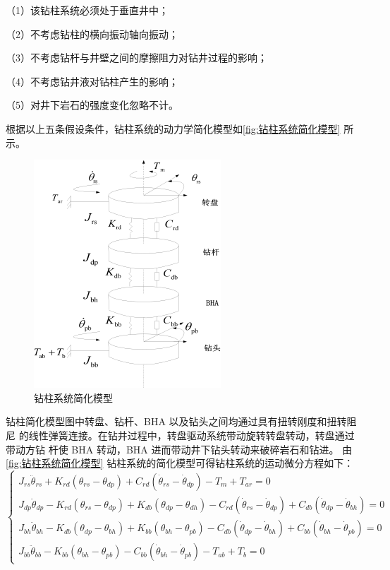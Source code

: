 \documentclass[12pt,hyperref,a4paper,UTF8]{ctexart}
\begin{document}
	（1）该钻柱系统必须处于垂直井中；
	
	（2）不考虑钻柱的横向振动轴向振动；
	
	（3）不考虑钻杆与井壁之间的摩擦阻力对钻井过程的影响；
	
	（4）不考虑钻井液对钻柱产生的影响；
	
	（5）对井下岩石的强度变化忽略不计。
	
	根据以上五条假设条件，钻柱系统的动力学简化模型如\autoref{fig:钻柱系统简化模型} 所示。
	
	
	\begin{figure}[!htbp]
		\centering
		\includegraphics[width=0.5\linewidth]{figures/钻柱系统简化模型}
		\caption{钻柱系统简化模型}
		\label{fig:钻柱系统简化模型}
	\end{figure}
	
	
	钻柱简化模型图中转盘、钻杆、BHA 以及钻头之间均通过具有扭转刚度和扭转阻尼 的线性弹簧连接。在钻井过程中，转盘驱动系统带动旋转转盘转动，转盘通过带动方钻 杆使 BHA 转动，BHA 进而带动井下钻头转动来破碎岩石和钻进。
	由\autoref{fig:钻柱系统简化模型} 钻柱系统的简化模型可得钻柱系统的运动微分方程如下：
	\begin{equation}
		\left\{ \begin{array}{l}
			{J_{rs}}{{\ddot \theta }_{rs}} + {K_{rd}}({\theta _{rs}} - {\theta _{dp}}) + {C_{rd}}({{\dot \theta }_{rs}} - {{\dot \theta }_{dp}}) - {T_m} + {T_{ar}} = 0\\
			{J_{dp}}{{\ddot \theta }_{dp}} - {K_{rd}}({\theta _{rs}} - {\theta _{dp}}) + {K_{db}}({\theta _{dp}} - {\theta _{dh}}) - {C_{rd}}({{\dot \theta }_{rs}} - {{\dot \theta }_{dp}}) + {C_{db}}({{\dot \theta }_{dp}} - {{\dot \theta }_{bh}}) = 0\\
			{J_{bh}}{{\ddot \theta }_{bh}} - {K_{db}}({\theta _{dp}} - {\theta _{bh}}) + {K_{bb}}({\theta _{bh}} - {\theta _{pb}}) - {C_{db}}({{\dot \theta }_{dp}} - {{\dot \theta }_{bh}}) + {C_{bb}}({{\dot \theta }_{bh}} - {{\dot \theta }_{pb}}) = 0\\
			{J_{bb}}{{\ddot \theta }_{bb}} - {K_{bb}}({\theta _{bh}} - {\theta _{pb}}) - {C_{bb}}({{\dot \theta }_{bh}} - {{\dot \theta }_{pb}}) - {T_{ab}} + {T_b} = 0
		\end{array} \right.
		\label{eq:钻柱系统的运动微分方程}
	\end{equation}
	
\end{document}
